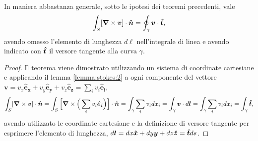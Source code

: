 \begin{theorem} In maniera abbastanza generale, sotto le ipotesi dei teoremi precedenti, vale
\begin{equation}
  \int_S [\bm{\nabla} \times \bm{v}] \cdot \bm{\hat{n}} = \oint_{\gamma} \bm{v} \cdot \bm{\hat{t}} ,
\end{equation}
  avendo omesso l'elemento di lunghezza $d\ell$ nell'integrale di linea e avendo indicato con $\bm{\hat{t}}$ il versore tangente alla curva $\gamma$.
\end{theorem}

\begin{proof}
Il teorema viene dimostrato utilizzando un sistema di coordinate cartesiane e applicando il lemma \ref{lemma:stokes:2} a ogni componente del vettore $\bm{v} = v_x \bm{\hat{e}_x} + v_y \bm{\hat{e}_y} + v_z \bm{\hat{e}_z} = \sum_i v_i \bm{\hat{e}_i}$,
\begin{equation}
\int_S [\bm{\nabla} \times \bm{v}] \cdot \bm{\hat{n}} = 
\int_S \Big[\bm{\nabla} \times \Big(\sum_i v_i \bm{\hat{e}_i}\Big)\Big] \cdot \bm{\hat{n}} =
\int_{\gamma} \sum_i v_i dx_i = \int_{\gamma} \bm{v} \cdot d\bm{l} =
\int_{\gamma} \sum_i v_i dx_i = \int_{\gamma} \bm{\hat{t}} ,
\end{equation}
 avendo utilizzato le coordinate cartesiane e la definizione di versore tangente per esprimere l'elemento di lunghezza, $d\bm{l} = dx \bm{\hat{x}} + dy \bm{y} + dz \bm{\hat{z}} = \bm{\hat{t}} ds$.
\end{proof}

